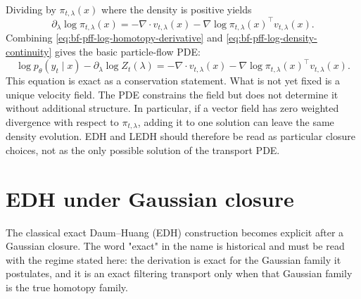 Dividing by $\pi_{t,\lambda}(x)$ where the density is positive yields
\begin{equation}
\label{eq:bf-pff-log-density-continuity}
  \partial_\lambda \log \pi_{t,\lambda}(x)
  = -\nabla \cdot v_{t,\lambda}(x)
    - \nabla \log \pi_{t,\lambda}(x)^\top v_{t,\lambda}(x).
\end{equation}
Combining \eqref{eq:bf-pff-log-homotopy-derivative} and
\eqref{eq:bf-pff-log-density-continuity} gives the basic particle-flow PDE:
\begin{equation}
\label{eq:bf-pff-flow-pde}
  \log p_\theta(y_t \mid x)
  - \partial_\lambda \log Z_t(\lambda)
  = -\nabla \cdot v_{t,\lambda}(x)
    - \nabla \log \pi_{t,\lambda}(x)^\top v_{t,\lambda}(x).
\end{equation}
This equation is exact as a conservation statement.  What is not yet fixed is a
unique velocity field.  The PDE constrains the field but does not determine it
without additional structure.  In particular, if a vector field has zero
weighted divergence with respect to $\pi_{t,\lambda}$, adding it to one
solution can leave the same density evolution.  EDH and LEDH should therefore
be read as particular closure choices, not as the only possible solution of the
transport PDE.

\section{EDH under Gaussian closure}
\label{sec:bf-pff-edh}

The classical exact Daum--Huang (EDH) construction becomes explicit after a
Gaussian closure.  The word "exact" in the name is historical and must be read
with the regime stated here: the derivation is exact for the Gaussian family it
postulates, and it is an exact filtering transport only when that Gaussian
family is the true homotopy family.

